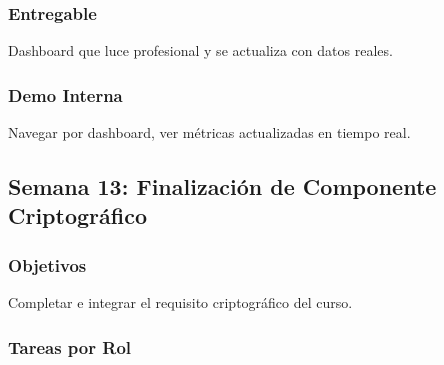 \documentclass[12pt,a4paper]{article}
\begin{document}
\subsubsection{Entregable}
Dashboard que luce profesional y se actualiza con datos reales.

\subsubsection{Demo Interna}
Navegar por dashboard, ver métricas actualizadas en tiempo real.

\subsection{Semana 13: Finalización de Componente Criptográfico}

\subsubsection{Objetivos}
Completar e integrar el requisito criptográfico del curso.

\subsubsection{Tareas por Rol}
\end{document}
